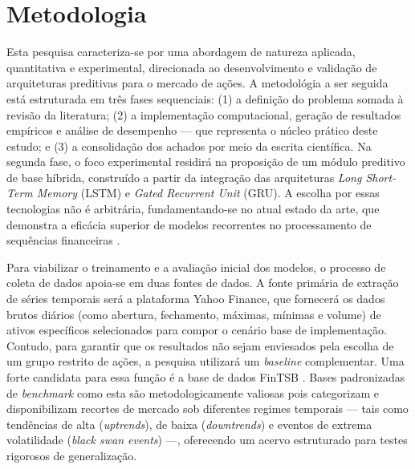 \documentclass[12pt, a4paper, twoside]{article}
\begin{document}
\newpage

\section{Metodologia}

Esta pesquisa caracteriza-se por uma abordagem de natureza aplicada, quantitativa e experimental, direcionada ao desenvolvimento e validação de arquiteturas preditivas para o mercado de ações. A metodológia a ser seguida está estruturada em três fases sequenciais: (1) a definição do problema somada à revisão da literatura; (2) a implementação computacional, geração de resultados empíricos e análise de desempenho — que representa o núcleo prático deste estudo; e (3) a consolidação dos achados por meio da escrita científica. Na segunda fase, o foco experimental residirá na proposição de um módulo preditivo de base híbrida, construído a partir da integração das arquiteturas \textit{Long Short-Term Memory} (LSTM) e \textit{Gated Recurrent Unit} (GRU). A escolha por essas tecnologias não é arbitrária, fundamentando-se no atual estado da arte, que demonstra a eficácia superior de modelos recorrentes no processamento de sequências financeiras \cite{k_leveraging_2023, wang_stock_2023, haryono_transformer-gated_2023}.

Para viabilizar o treinamento e a avaliação inicial dos modelos, o processo de coleta de dados apoia-se em duas fontes de dados. A fonte primária de extração de séries temporais será a plataforma Yahoo Finance, que fornecerá os dados brutos diários (como abertura, fechamento, máximas, mínimas e volume) de ativos específicos selecionados para compor o cenário base de implementação. Contudo, para garantir que os resultados não sejam enviesados pela escolha de um grupo restrito de ações, a pesquisa utilizará um \textit{baseline} complementar. Uma forte candidata para essa função é a base de dados FinTSB \cite{hu_fintsb_2025}. Bases padronizadas de \textit{benchmark} como esta são metodologicamente valiosas pois categorizam e disponibilizam recortes de mercado sob diferentes regimes temporais — tais como tendências de alta (\textit{uptrends}), de baixa (\textit{downtrends}) e eventos de extrema volatilidade (\textit{black swan events}) —, oferecendo um acervo estruturado para testes rigorosos de generalização.
\end{document}
